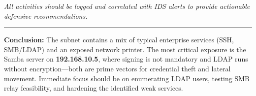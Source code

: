 \emph{All activities should be logged and correlated with IDS alerts to
provide actionable defensive recommendations.}

\begin{center}
            \rule{0.5\linewidth}{0.5pt}
\end{center}

\textbf{Conclusion:} The subnet contains a mix of typical enterprise
services (SSH, SMB/LDAP) and an exposed network printer. The most
critical exposure is the Samba server on \textbf{192.168.10.5}, where
signing is not mandatory and LDAP runs without encryption---both are
prime vectors for credential theft and lateral movement. Immediate focus
should be on enumerating LDAP users, testing SMB relay feasibility, and
hardening the identified weak services.
